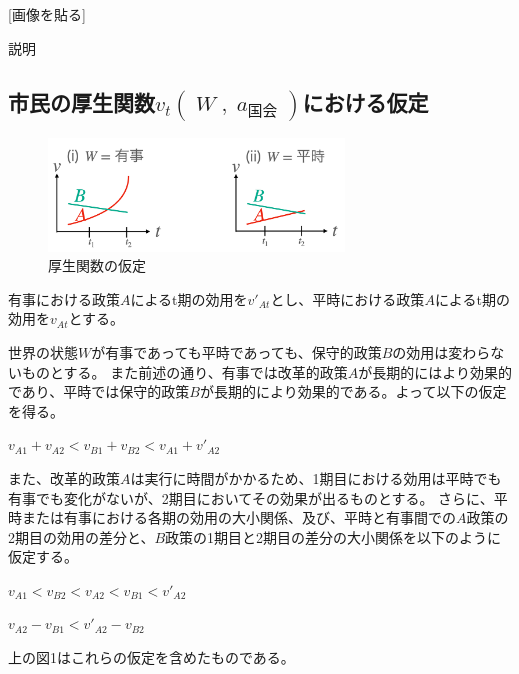 \documentclass[main.tex]{subfiles}
\begin{document}
[画像を貼る]

説明


\subsection{市民の厚生関数$v_t(\;W\;,\; a_\text{国会}\;)$における仮定}

\begin{figure}[htbp]
  \centering
  \includegraphics[width=0.7\textwidth]{./image/assumption_welfare_policy.png}
  \caption{厚生関数の仮定} 
  \label{fig:assumption_welfare_policy}
\end{figure}

有事における政策$A$によるt期の効用を$v'_{At}$とし、平時における政策$A$によるt期の効用を$v_{At}$とする。

世界の状態$W$が有事であっても平時であっても、保守的政策$B$の効用は変わらないものとする。
また前述の通り、有事では改革的政策$A$が長期的にはより効果的であり、平時では保守的政策$B$が長期的により効果的である。よって以下の仮定を得る。
\begin{assumption}  $v_{A1} + v_{A2}<v_{B1} + v_{B2} <  v_{A1} + v'_{A2}$ \end{assumption}


また、改革的政策$A$は実行に時間がかかるため、1期目における効用は平時でも有事でも変化がないが、2期目においてその効果が出るものとする。
さらに、平時または有事における各期の効用の大小関係、及び、平時と有事間での$A$政策の2期目の効用の差分と、$B$政策の1期目と2期目の差分の大小関係を以下のように仮定する。
\begin{assumption}  $v_{A1} < v_{B2} < v_{A2} < v_{B1} < v'_{A2}$  \end{assumption}
\begin{assumption}  $v_{A2} - v_{B1} < v'_{A2} - v_{B2}$  \end{assumption}

上の図1はこれらの仮定を含めたものである。
\end{document}
